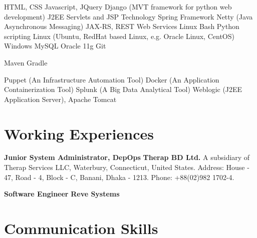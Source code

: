 \documentclass[11pt,a4paper,sans]{moderncv}
\begin{document}
{
HTML, CSS
\newline Javascript, JQuery
\newline Django (MVT framework for python web development)
\newline J2EE Servlets and JSP Technology
\newline Spring Framework
\newline Netty (Java Asynchronous Messaging)
\newline JAX-RS, REST Web Services
}
{
Linux Bash
\newline Python scripting
}
{
Linux (Ubuntu, RedHat based Linux, e.g. Oracle Linux, CentOS)
\newline Windows
}
{
MySQL
\newline Oracle 11g
}
{
Git
}

{
Maven
\newline Gradle
}

{
Puppet (An Infrastructure Automation Tool)
\newline Docker (An Application Containerization Tool)
\newline Splunk (A Big Data Analytical Tool)
\newline Weblogic (J2EE Application Server), Apache Tomcat
}


\section{Working Experiences}
{
\textbf{Junior System Administrator, DepOps\newline}
\textbf{Therap BD Ltd.\newline}
A subsidiary of Therap Services LLC, Waterbury, Connecticut, United States.\newline
Address: House - 47, Road - 4, Block - C, Banani, Dhaka - 1213. \newline
Phone: +88(02)982 1702-4.
}

{
\textbf{Software Engineer\newline}
\textbf{Reve Systems\newline}
}



\section{Communication Skills}
\end{document}
